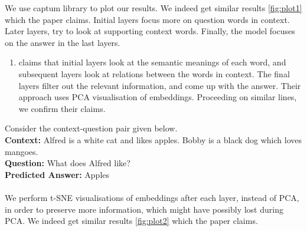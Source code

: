 \documentclass[10pt,twocolumn,letterpaper]{article}
\begin{document}
We use captum library to plot our results. We indeed get similar results \ref{fig:plot1} which the paper claims. Initial layers focus more on question words in context. Later layers, try to look at supporting context words. Finally, the model focuses on the answer in the last layers.
\begin{enumerate}[resume]
    \item \cite{bert_layers_qa} claims that initial layers look at the semantic meanings of each word, and subsequent layers look at relations between the words in context. The final layers filter out the relevant information, and come up with the answer. Their approach uses PCA visualisation of embeddings.  Proceeding on similar lines, we confirm their claims.
\end{enumerate}
Consider the context-question pair given below.\\
\textbf{Context: }Alfred is a white cat and likes apples. Bobby is a black dog which loves mangoes.\\
\textbf{Question: }What does Alfred like?\\
\textbf{Predicted Answer: }Apples
\\\\
We perform t-SNE visualisations of embeddings after each layer, instead of PCA, in order to preserve more information, which might have possibly lost during PCA. We indeed get similar results \ref{fig:plot2} which the paper claims.
\end{document}
